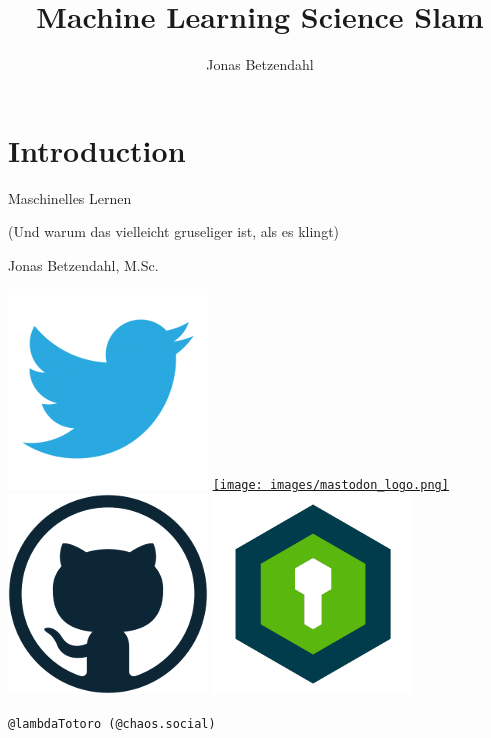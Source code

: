 \documentclass[aspectratio=169,x11names]{beamer}
\author{Jonas Betzendahl}
\title{Machine Learning Science Slam}
\begin{document}
\section{Introduction}

\begin{frame}
\begin{center}
\vfill
\huge Maschinelles Lernen
\normalsize 

(Und warum das vielleicht gruseliger ist, als es klingt)
\bigskip\bigskip

\large Jonas Betzendahl, M.Sc.
\bigskip\bigskip

\href{https://twitter.com/lambdatotoro}{\includegraphics[scale=0.125]{images/twitter_logo.png}}
\href{https://chaos.social/@lambdatotoro}{\texttt{[image: images/mastodon\_logo.png]}}
\href{https://github.com/lambdaTotoro}{\includegraphics[scale=0.125]{images/github_logo.png}}
\href{https://whispeer.de/en/user/jbetzend}{\includegraphics[scale=0.125]{images/whispeer_logo.png}}

\texttt{@lambdaTotoro (@chaos.social)}
\end{center}
\end{frame}
\end{document}
